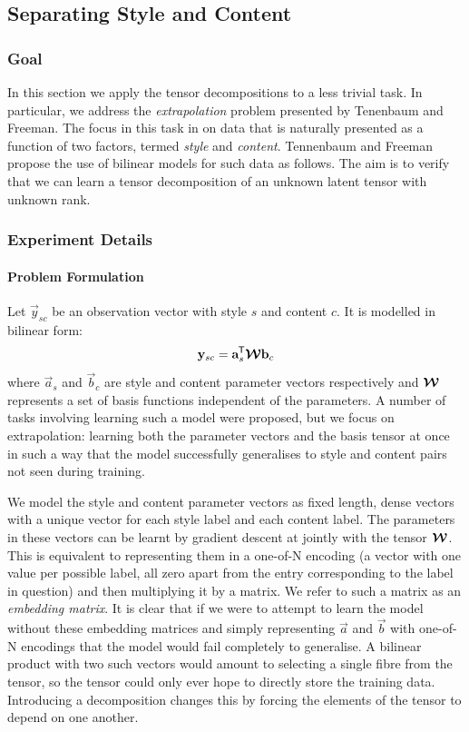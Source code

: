 \subsection{Separating Style and Content}
\subsubsection{Goal}
In this section we apply the tensor decompositions to a less trivial task. In particular, we
address the \textit{extrapolation} problem presented by Tenenbaum and 
Freeman. \autocite{Tenenbaum2000} The focus in this task in on data that is naturally presented as a
function of two factors, termed \textit{style} and \textit{content}. Tennenbaum and Freeman
propose the use of bilinear models for such data as follows. The aim is to verify that we
can learn a tensor decomposition of an unknown latent tensor with unknown rank.

\subsubsection{Experiment Details}
\paragraph{Problem Formulation}
Let \(\vec{y}_{sc}\) be an observation vector with style \(s\) and content \(c\). It is modelled
in bilinear form:
\begin{equation}
	\mathbf{y}_{sc} = \mathbf{a}_s^{\mkern-1.5mu\mathsf{T}}\bm{\mathcal{W}}\mathbf{b}_c
\end{equation} where \(\vec{a}_s\) and \(\vec{b}_c\) are style and content parameter vectors
respectively and \(\bm{\mathcal{W}}\) represents a set of basis functions independent of the parameters.
A number of tasks involving learning such a model were proposed, but we focus on extrapolation:
 learning both the parameter vectors and the basis tensor at once in such a way that
the model successfully generalises to style and content pairs not seen during training.

We model the style and content parameter vectors as fixed length, dense vectors with a unique
vector for each style label and each content label. The parameters in these vectors can be
learnt by gradient descent at jointly with the tensor \(\bm{\mathcal{W}}\). This is equivalent
to representing them in a one-of-N encoding (a vector with one value per possible label, all
zero apart from the entry corresponding to the label in question) and then multiplying it by
a matrix. We refer to such a matrix as an \textit{embedding matrix}. It is clear that if we
were to attempt to learn the model without these embedding matrices and simply representing
\(\vec{a}\) and \(\vec{b}\) with one-of-N encodings that the model would fail completely to
generalise. A bilinear product with two such vectors would amount to selecting a single fibre
from the tensor, so the tensor could only ever hope to directly store the training data.
Introducing a decomposition changes this by forcing the elements of the tensor to depend on
one another.


